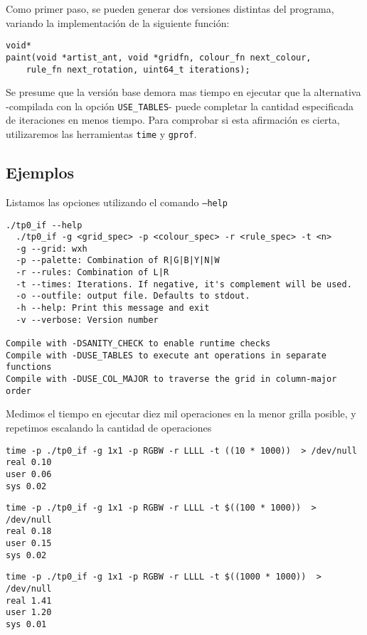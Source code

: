 \documentclass{article}
\begin{document}
Como primer paso, se pueden generar dos versiones distintas del programa, variando la implementación de la siguiente
función:
\begin{small}
\begin{verbatim}
void*
paint(void *artist_ant, void *gridfn, colour_fn next_colour, 
    rule_fn next_rotation, uint64_t iterations);
\end{verbatim}
\end{small}

Se presume que la versión base demora mas tiempo en ejecutar que la alternativa -compilada con la opción 
\texttt{USE\_TABLES}- puede completar la cantidad especificada de iteraciones en menos tiempo.  Para comprobar si esta 
afirmación es cierta, utilizaremos las herramientas \texttt{time} y \texttt{gprof}.

\pagebreak
\subsection{Ejemplos}

Listamos las opciones utilizando el comando \texttt{--help}
\begin{verbatim}
./tp0_if --help
  ./tp0_if -g <grid_spec> -p <colour_spec> -r <rule_spec> -t <n>
  -g --grid: wxh
  -p --palette: Combination of R|G|B|Y|N|W
  -r --rules: Combination of L|R
  -t --times: Iterations. If negative, it's complement will be used.
  -o --outfile: output file. Defaults to stdout.
  -h --help: Print this message and exit
  -v --verbose: Version number

Compile with -DSANITY_CHECK to enable runtime checks
Compile with -DUSE_TABLES to execute ant operations in separate functions
Compile with -DUSE_COL_MAJOR to traverse the grid in column-major order
\end{verbatim}

Medimos el tiempo en ejecutar diez mil operaciones en la menor grilla posible, y repetimos escalando la cantidad
de operaciones
\begin{verbatim}
time -p ./tp0_if -g 1x1 -p RGBW -r LLLL -t ((10 * 1000))  > /dev/null
real 0.10
user 0.06
sys 0.02
\end{verbatim}

\begin{verbatim}
time -p ./tp0_if -g 1x1 -p RGBW -r LLLL -t $((100 * 1000))  > /dev/null
real 0.18
user 0.15
sys 0.02
\end{verbatim}

\begin{verbatim}
time -p ./tp0_if -g 1x1 -p RGBW -r LLLL -t $((1000 * 1000))  > /dev/null
real 1.41
user 1.20
sys 0.01
\end{verbatim}
\end{document}

